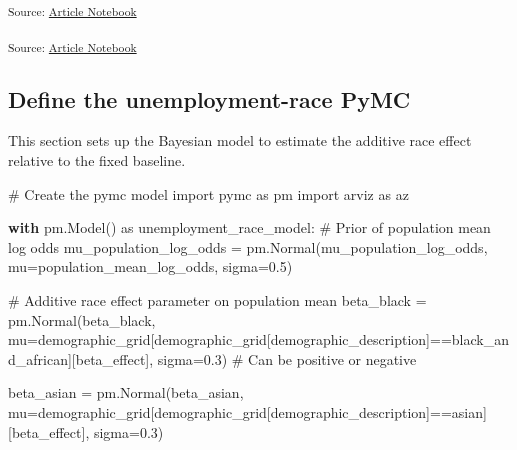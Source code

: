 \documentclass[
]{agujournal2019}
\newenvironment{Shaded}{\begin{snugshade}}{\end{snugshade}}
\newcommand{\CommentTok}[1]{\textcolor[rgb]{0.37,0.37,0.37}{#1}}
\newcommand{\ControlFlowTok}[1]{\textcolor[rgb]{0.00,0.23,0.31}{\textbf{#1}}}
\newcommand{\FloatTok}[1]{\textcolor[rgb]{0.68,0.00,0.00}{#1}}
\newcommand{\ImportTok}[1]{\textcolor[rgb]{0.00,0.46,0.62}{#1}}
\newcommand{\NormalTok}[1]{\textcolor[rgb]{0.00,0.23,0.31}{#1}}
\newcommand{\OperatorTok}[1]{\textcolor[rgb]{0.37,0.37,0.37}{#1}}
\newcommand{\StringTok}[1]{\textcolor[rgb]{0.13,0.47,0.30}{#1}}
\begin{document}
\textsubscript{Source:
\href{https://mw1296.github.io/dsan5650_social_causal_inference/index.qmd.html}{Article
Notebook}}

\textsubscript{Source:
\href{https://mw1296.github.io/dsan5650_social_causal_inference/index.qmd.html}{Article
Notebook}}

\subsection{Define the unemployment-race
PyMC}\label{define-the-unemployment-race-pymc}

This section sets up the Bayesian model to estimate the additive race
effect relative to the fixed baseline.

\begin{Shaded}
\begin{Highlighting}[]
\CommentTok{\# Create the pymc model}
\ImportTok{import}\NormalTok{ pymc }\ImportTok{as}\NormalTok{ pm}
\ImportTok{import}\NormalTok{ arviz }\ImportTok{as}\NormalTok{ az}

\ControlFlowTok{with}\NormalTok{ pm.Model() }\ImportTok{as}\NormalTok{ unemployment\_race\_model:}
    \CommentTok{\# Prior of population mean log odds}
\NormalTok{    mu\_population\_log\_odds }\OperatorTok{=}\NormalTok{ pm.Normal(}\StringTok{\textquotesingle{}mu\_population\_log\_odds\textquotesingle{}}\NormalTok{, mu}\OperatorTok{=}\NormalTok{population\_mean\_log\_odds, sigma}\OperatorTok{=}\FloatTok{0.5}\NormalTok{)}
    
    \CommentTok{\# Additive race effect parameter on population mean}
\NormalTok{    beta\_black }\OperatorTok{=}\NormalTok{ pm.Normal(}\StringTok{\textquotesingle{}beta\_black\textquotesingle{}}\NormalTok{, mu}\OperatorTok{=}\NormalTok{demographic\_grid[demographic\_grid[}\StringTok{\textquotesingle{}demographic\_description\textquotesingle{}}\NormalTok{]}\OperatorTok{==}\StringTok{\textquotesingle{}black\_and\_african\textquotesingle{}}\NormalTok{][}\StringTok{\textquotesingle{}beta\_effect\textquotesingle{}}\NormalTok{], sigma}\OperatorTok{=}\FloatTok{0.3}\NormalTok{) }\CommentTok{\# Can be positive or negative}

\NormalTok{    beta\_asian }\OperatorTok{=}\NormalTok{ pm.Normal(}\StringTok{\textquotesingle{}beta\_asian\textquotesingle{}}\NormalTok{, mu}\OperatorTok{=}\NormalTok{demographic\_grid[demographic\_grid[}\StringTok{\textquotesingle{}demographic\_description\textquotesingle{}}\NormalTok{]}\OperatorTok{==}\StringTok{\textquotesingle{}asian\textquotesingle{}}\NormalTok{][}\StringTok{\textquotesingle{}beta\_effect\textquotesingle{}}\NormalTok{], sigma}\OperatorTok{=}\FloatTok{0.3}\NormalTok{) }


\end{Highlighting}
\end{Shaded}
\end{document}
